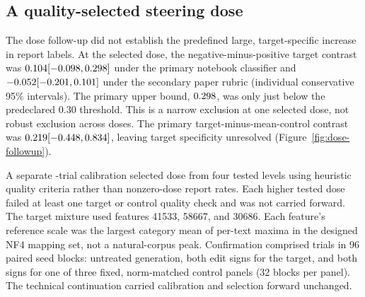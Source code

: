 
\subsection{A quality-selected steering dose}
\label{sec:dose-followup}

The dose follow-up did not establish the predefined large, target-specific
increase in report labels. At the selected dose, the negative-minus-positive
target contrast was \(0.104{}
[-0.098{}, 0.298{}]\) under the primary
notebook classifier and \(-0.052{}
[-0.201{}, 0.101{}]\) under the secondary paper rubric
(individual conservative 95\% intervals). The primary upper bound,
\(0.298{}\), was only just below the predeclared 0.30
threshold. This is a narrow exclusion at one selected dose, not robust
exclusion across doses. The primary target-minus-mean-control contrast was
\(0.219{}
[-0.448{}, 0.834{}]\), leaving
target specificity unresolved (Figure~\ref{fig:dose-followup}).

A separate \DoseMainCalibrationTrials{}-trial calibration selected dose
\DoseMainSelectedDose{} from four tested levels using heuristic quality
criteria rather than nonzero-dose report rates. Each higher tested dose failed
at least one target or control quality check and was not carried forward.
The target mixture used features 41533, 58667, and 30686. Each feature's
reference scale was the largest category mean of per-text maxima in the
designed NF4 mapping set, not a natural-corpus peak. Confirmation comprised
\DoseMainTrials{} trials in 96 paired seed blocks: untreated generation,
both edit signs for the target, and both signs for one of three fixed,
norm-matched control panels (32 blocks per panel). The technical continuation
carried calibration and selection forward unchanged.


